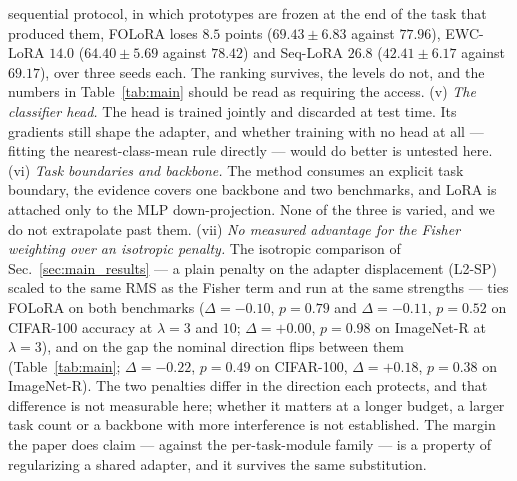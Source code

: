 sequential protocol, in which prototypes are frozen at the end of the task that produced
them, FOLoRA loses $8.5$ points ($69.43\pm6.83$ against $77.96$), EWC-LoRA $14.0$
($64.40\pm5.69$ against $78.42$) and Seq-LoRA $26.8$ ($42.41\pm6.17$ against $69.17$), over
three seeds each. The ranking survives, the levels do not, and the numbers in
Table~\ref{tab:main} should be read as requiring the access.
(v) \emph{The classifier head.} The head is trained jointly and discarded at test time. Its
gradients still shape the adapter, and whether training with no head at all --- fitting the
nearest-class-mean rule directly --- would do better is untested here.
(vi) \emph{Task boundaries and backbone.} The method consumes an explicit task boundary, the
evidence covers one backbone and two benchmarks, and LoRA is attached only to the MLP
down-projection. None of the three is varied, and we do not extrapolate past them.
(vii) \emph{No measured advantage for the Fisher weighting over an isotropic penalty.} The
isotropic comparison of Sec.~\ref{sec:main_results} --- a plain penalty on the adapter
displacement (L2-SP) scaled to the same RMS as the Fisher term and run at the same strengths
--- ties FOLoRA on both benchmarks ($\Delta=-0.10$, $p=0.79$ and $\Delta=-0.11$, $p=0.52$ on
CIFAR-100 accuracy at $\lambda=3$ and $10$; $\Delta=+0.00$, $p=0.98$ on ImageNet-R at
$\lambda=3$), and on the gap the nominal direction flips between them
(Table~\ref{tab:main}; $\Delta=-0.22$, $p=0.49$ on CIFAR-100, $\Delta=+0.18$, $p=0.38$ on
ImageNet-R). The two penalties differ in the direction each protects, and that
difference is not measurable here; whether it matters at a longer budget, a larger task count
or a backbone with more interference is not established. The margin the paper does claim ---
against the per-task-module family --- is a property of regularizing a shared adapter, and it
survives the same substitution.

